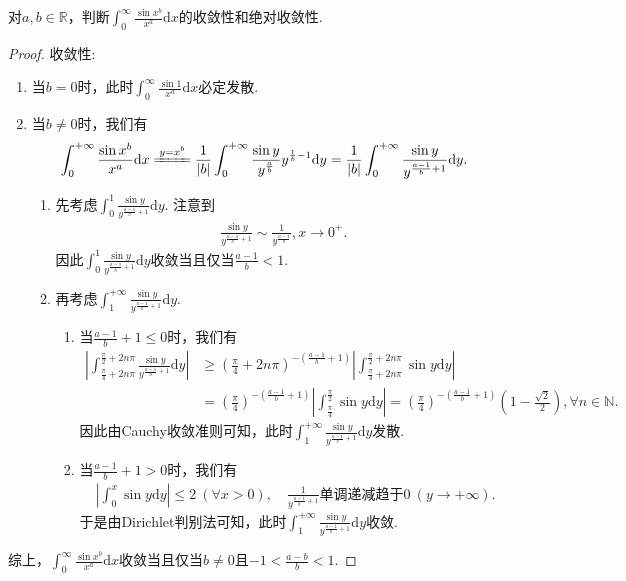 \documentclass[../../main.tex]{subfiles}
\begin{document}
\begin{example}
对\(a,b\in\mathbb{R}\)，判断\(\int_{0}^{\infty}\frac{\sin x^b}{x^a}\mathrm{d}x\)的收敛性和绝对收敛性. 
\end{example}
\begin{proof}
{\heiti 收敛性:}
\begin{enumerate}
    \item 当\(b = 0\)时，此时\(\int_{0}^{\infty}\frac{\sin 1}{x^a}\mathrm{d}x\)必定发散.
    \item 当\(b\neq 0\)时，我们有
\begin{align}\label{100.52}
\int_{0}^{+\infty}\frac{\sin x^b}{x^a}\mathrm{d}x&\xlongequal{y = x^b}\frac{1}{|b|}\int_{0}^{+\infty}\frac{\sin y}{y^{\frac{a}{b}}}y^{\frac{1}{b}-1}\mathrm{d}y=\frac{1}{|b|}\int_{0}^{+\infty}\frac{\sin y}{y^{\frac{a - 1}{b}+1}}\mathrm{d}y.
\end{align}
    \begin{enumerate}
        \item 先考虑\(\int_{0}^{1}\frac{\sin y}{y^{\frac{a - 1}{b}+1}}\mathrm{d}y\). 注意到
\begin{align*}
\frac{\sin y}{y^{\frac{a - 1}{b}+1}}\sim\frac{1}{y^{\frac{a - 1}{b}}},x\rightarrow 0^+.
\end{align*}
因此\(\int_{0}^{1}\frac{\sin y}{y^{\frac{a - 1}{b}+1}}\mathrm{d}y\)收敛当且仅当\(\frac{a - 1}{b}<1\).
        \item 再考虑\(\int_{1}^{+\infty}\frac{\sin y}{y^{\frac{a - 1}{b}+1}}\mathrm{d}y\).
        \begin{enumerate}
            \item 当\(\frac{a - 1}{b}+1\leqslant 0\)时，我们有
\begin{align*}
\left|\int_{\frac{\pi}{4}+2n\pi}^{\frac{\pi}{2}+2n\pi}\frac{\sin y}{y^{\frac{a - 1}{b}+1}}\mathrm{d}y\right| &\geqslant \left(\frac{\pi}{4}+2n\pi\right)^{-\left(\frac{a - 1}{b}+1\right)}\left|\int_{\frac{\pi}{4}+2n\pi}^{\frac{\pi}{2}+2n\pi}\sin y\mathrm{d}y\right|\\
&=\left(\frac{\pi}{4}\right)^{-\left(\frac{a - 1}{b}+1\right)}\left|\int_{\frac{\pi}{4}}^{\frac{\pi}{2}}\sin y\mathrm{d}y\right|=\left(\frac{\pi}{4}\right)^{-\left(\frac{a - 1}{b}+1\right)}\left(1 - \frac{\sqrt{2}}{2}\right),\forall n\in\mathbb{N}.
\end{align*}
因此由Cauchy收敛准则可知，此时\(\int_{1}^{+\infty}\frac{\sin y}{y^{\frac{a - 1}{b}+1}}\mathrm{d}y\)发散.
            \item 当\(\frac{a - 1}{b}+1>0\)时，我们有
\begin{align*}
\left|\int_{0}^{x}\sin y\mathrm{d}y\right|\leqslant 2\ (\forall x > 0),\quad \frac{1}{y^{\frac{a - 1}{b}+1}}\text{单调递减趋于}0\ (y\rightarrow +\infty).
\end{align*}
于是由Dirichlet判别法可知，此时\(\int_{1}^{+\infty}\frac{\sin y}{y^{\frac{a - 1}{b}+1}}\mathrm{d}y\)收敛.
        \end{enumerate}
    \end{enumerate}
\end{enumerate}
综上，\(\int_{0}^{\infty}\frac{\sin x^b}{x^a}\mathrm{d}x\)收敛当且仅当\(b\neq 0\)且\(-1<\frac{a - b}{b}<1\).


\end{proof}
\end{document}
